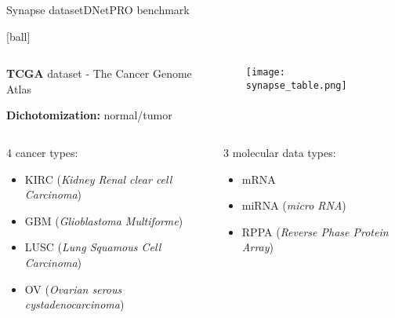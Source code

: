 \documentclass{standalone}
\begin{document}
\begin{frame}{Synapse dataset}{DNetPRO benchmark}

  [ball]

  \begin{columns}

    \begin{column}{0.5\linewidth}
      \textbf{TCGA} dataset - The Cancer Genome Atlas

      \vspace{0.5cm}

      \textbf{Dichotomization:} normal/tumor
    \end{column}

    \begin{column}{0.5\linewidth}
      \begin{figure}
        \centering
        \texttt{[image: synapse\_table.png]}
      \end{figure}
    \end{column}

  \end{columns}

  \vspace{1cm}

  \begin{columns}

    \begin{column}{0.6\linewidth}

    4 cancer types:

    \begin{itemize}
      \item KIRC (\emph{Kidney Renal clear cell Carcinoma})
      \item GBM (\emph{Glioblastoma Multiforme})
      \item LUSC (\emph{Lung Squamous Cell Carcinoma})
      \item OV (\emph{Ovarian serous cystadenocarcinoma})
    \end{itemize}

    \end{column}

    \begin{column}{0.4\linewidth}

      3 molecular data types:

      \begin{itemize}
        \item mRNA
        \item miRNA (\emph{micro RNA})
        \item RPPA (\emph{Reverse Phase Protein Array})
      \end{itemize}

    \end{column}

  \end{columns}

\end{frame}
\end{document}
